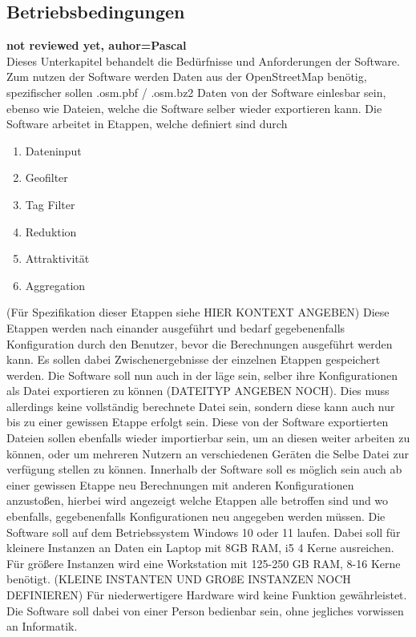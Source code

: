 \documentclass[parskip=full]{scrartcl} %
\begin{document}
\subsection{Betriebsbedingungen}
\textbf{not reviewed yet, auhor=Pascal\\}
Dieses Unterkapitel behandelt die Bedürfnisse und Anforderungen der Software.
Zum nutzen der Software werden Daten aus der OpenStreetMap benötig, spezifischer sollen .osm.pbf / .osm.bz2 Daten von der Software einlesbar sein, ebenso wie Dateien, welche die Software selber wieder exportieren kann.
Die Software arbeitet in Etappen, welche definiert sind durch
\begin{enumerate}
    \item Dateninput
    \item Geofilter
    \item Tag Filter
    \item Reduktion
    \item Attraktivität
    \item Aggregation
\end{enumerate}

(Für Spezifikation dieser Etappen siehe HIER KONTEXT ANGEBEN)
Diese Etappen werden nach einander ausgeführt und bedarf gegebenenfalls Konfiguration durch den Benutzer, bevor die Berechnungen ausgeführt werden kann.
Es sollen dabei Zwischenergebnisse der einzelnen Etappen gespeichert werden.
Die Software soll nun auch in der läge sein, selber ihre Konfigurationen als Datei exportieren zu können (DATEITYP ANGEBEN NOCH). Dies muss allerdings keine vollständig berechnete Datei sein, sondern diese kann auch nur bis zu einer gewissen Etappe erfolgt sein.
Diese von der Software exportierten Dateien sollen ebenfalls wieder importierbar sein, um an diesen weiter arbeiten zu können, oder um mehreren Nutzern an verschiedenen Geräten die Selbe Datei zur verfügung stellen zu können.
Innerhalb der Software soll es möglich sein auch ab einer gewissen Etappe neu Berechnungen mit anderen Konfigurationen anzustoßen, hierbei wird angezeigt welche Etappen alle betroffen sind und wo ebenfalls, gegebenenfalls Konfigurationen neu angegeben werden müssen.
Die Software soll auf dem Betriebssystem Windows 10 oder 11 laufen.
Dabei soll für kleinere Instanzen an Daten ein Laptop mit 8GB RAM, i5 4 Kerne ausreichen.
Für größere Instanzen wird eine Workstation mit 125-250 GB RAM, 8-16 Kerne benötigt.
(KLEINE INSTANTEN UND GROßE INSTANZEN NOCH DEFINIEREN)
Für niederwertigere Hardware wird keine Funktion gewährleistet.
Die Software soll dabei von einer Person bedienbar sein, ohne jegliches vorwissen an Informatik.
\end{document}

